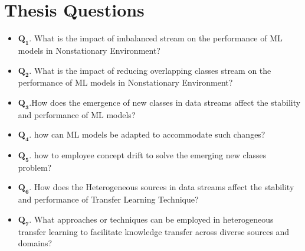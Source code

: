 \section{Thesis Questions}
\label{sec:1_introduction_questions}

\begin{itemize}[nosep]
    \setlength{\itemindent}{-.5in}
       \item $\pmb{Q_1}$. What is the impact of imbalanced stream on the performance of ML models in Nonstationary Environment?
        \item $\pmb{Q_2}$. What is the impact of reducing overlapping classes stream on the performance of ML models in Nonstationary Environment?
        \item $\pmb{Q_3}$.How does the emergence of new classes in data streams affect the stability and performance of ML models?
        \item $\pmb{Q_4}$. how can ML models be adapted to accommodate such changes?
        \item $\pmb{Q_5}$. how to employee concept drift to solve the emerging new classes problem?
        \item $\pmb{Q_6}$. How does the Heterogeneous sources in data streams affect the stability and performance of Transfer Learning Technique?
        \item $\pmb{Q_7}$. What approaches or techniques can be employed in heterogeneous transfer learning to facilitate knowledge transfer across diverse sources and domains?
    \end{itemize}
    